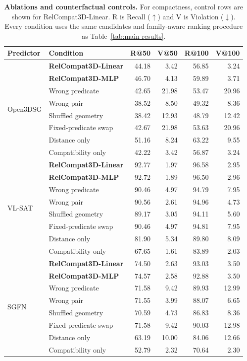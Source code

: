 \documentclass[letterpaper]{article}
\begin{document}
\begin{table}[t]
\centering
{\small
\setlength{\tabcolsep}{1.5pt}
\begin{tabular}{@{}llrrrr@{}}
\toprule
Predictor & Condition & R@50 & V@50 & R@100 & V@100 \\
\midrule
\multirow{8}{*}{Open3DSG} & \textbf{RelCompat3D-Linear} & 44.18 & 3.42 & 56.85 & 3.24 \\
& \textbf{RelCompat3D-MLP} & 46.70 & 4.13 & 59.89 & 3.71 \\
& Wrong predicate & 42.65 & 21.98 & 53.47 & 20.96 \\
& Wrong pair & 38.52 & 8.50 & 49.32 & 8.36 \\
& Shuffled geometry & 38.42 & 12.93 & 48.79 & 12.42 \\
& Fixed-predicate swap & 42.67 & 21.98 & 53.63 & 20.96 \\
& Distance only & 51.16 & 8.24 & 63.22 & 9.55 \\
& Compatibility only & 42.22 & 3.42 & 56.87 & 3.24 \\
\midrule
\multirow{8}{*}{VL-SAT} & \textbf{RelCompat3D-Linear} & 92.77 & 1.97 & 96.58 & 2.95 \\
& \textbf{RelCompat3D-MLP} & 92.72 & 1.89 & 96.50 & 2.96 \\
& Wrong predicate & 90.46 & 4.97 & 94.79 & 7.95 \\
& Wrong pair & 90.56 & 2.61 & 94.96 & 4.73 \\
& Shuffled geometry & 89.17 & 3.05 & 94.11 & 5.60 \\
& Fixed-predicate swap & 90.46 & 4.97 & 94.81 & 7.95 \\
& Distance only & 81.90 & 5.34 & 89.80 & 8.09 \\
& Compatibility only & 67.65 & 1.61 & 83.89 & 2.03 \\
\midrule
\multirow{8}{*}{SGFN} & \textbf{RelCompat3D-Linear} & 74.50 & 2.63 & 93.03 & 3.50 \\
& \textbf{RelCompat3D-MLP} & 74.57 & 2.58 & 92.88 & 3.50 \\
& Wrong predicate & 71.58 & 9.42 & 89.93 & 12.99 \\
& Wrong pair & 71.55 & 3.99 & 88.07 & 6.65 \\
& Shuffled geometry & 70.59 & 4.73 & 86.83 & 8.36 \\
& Fixed-predicate swap & 71.58 & 9.42 & 90.03 & 12.98 \\
& Distance only & 63.19 & 10.00 & 84.06 & 12.66 \\
& Compatibility only & 52.79 & 2.32 & 70.64 & 2.30 \\
\bottomrule
\end{tabular}
}
\caption{\textbf{Ablations and counterfactual controls.} For compactness, control rows are shown for RelCompat3D-Linear. R is Recall ($\uparrow$) and V is Violation ($\downarrow$). Every condition uses the same candidates and family-aware ranking procedure as Table~\ref{tab:main-results}.}
\label{tab:ablations}
\end{table}
\end{document}
